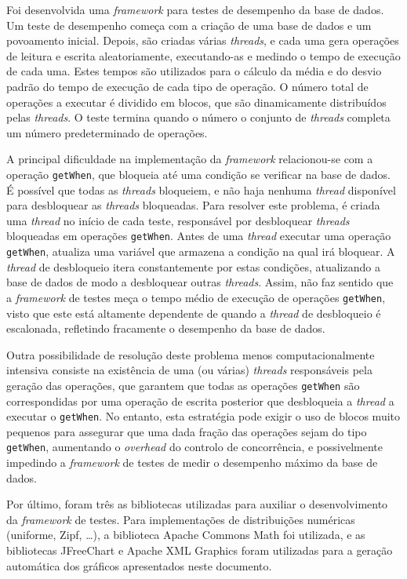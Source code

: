 \documentclass[11pt, a4paper]{article}
\begin{document}
Foi desenvolvida uma \emph{framework} para testes de desempenho da base de dados. Um teste de
desempenho começa com a criação de uma base de dados e um povoamento inicial. Depois, são criadas
várias \emph{threads}, e cada uma gera operações de leitura e escrita aleatoriamente, executando-as
e medindo o tempo de execução de cada uma. Estes tempos são utilizados para o cálculo da média e do
desvio padrão do tempo de execução de cada tipo de operação. O número total de operações a executar
é dividido em blocos, que são dinamicamente distribuídos pelas \emph{threads}. O teste termina
quando o número o conjunto de \emph{threads} completa um número predeterminado de operações.

A principal dificuldade na implementação da \emph{framework} relacionou-se com a operação
\texttt{getWhen}, que bloqueia até uma condição se verificar na base de dados. É possível que todas
as \emph{threads} bloqueiem, e não haja nenhuma \emph{thread} disponível para desbloquear as
\emph{threads} bloqueadas. Para resolver este problema, é criada uma \emph{thread} no início de cada
teste, responsável por desbloquear \emph{threads} bloqueadas em operações \texttt{getWhen}. Antes de
uma \emph{thread} executar uma operação \texttt{getWhen}, atualiza uma variável que armazena a
condição na qual irá bloquear. A \emph{thread} de desbloqueio itera constantemente por estas
condições, atualizando a base de dados de modo a desbloquear outras \emph{threads}. Assim, não faz
sentido que a \emph{framework} de testes meça o tempo médio de execução de operações
\texttt{getWhen}, visto que este está altamente dependente de quando a \emph{thread} de desbloqueio
é escalonada, refletindo fracamente o desempenho da base de dados.

Outra possibilidade de resolução deste problema menos computacionalmente intensiva consiste na
existência de uma (ou várias) \emph{threads} responsáveis pela geração das operações, que garantem
que todas as operações \texttt{getWhen} são correspondidas por uma operação de escrita posterior que
desbloqueia a \emph{thread} a executar o \texttt{getWhen}. No entanto, esta estratégia pode exigir o
uso de blocos muito pequenos para assegurar que uma dada fração das operações sejam do tipo
\texttt{getWhen}, aumentando o \emph{overhead} do controlo de concorrência, e possivelmente
impedindo a \emph{framework} de testes de medir o desempenho máximo da base de dados.

Por último, foram três as bibliotecas utilizadas para auxiliar o desenvolvimento da \emph{framework}
de testes. Para implementações de distribuições numéricas (uniforme, Zipf, \ldots), a biblioteca
Apache Commons Math \cite{apache-commons-math} foi utilizada, e as bibliotecas JFreeChart
\cite{jfreechart} e Apache XML Graphics \cite{apache-xml-graphics} foram utilizadas para a geração
automática dos gráficos apresentados neste documento.
\end{document}
